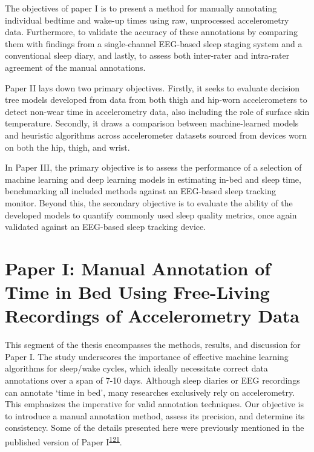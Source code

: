 \documentclass[
  10pt,
]{scrbook}
\begin{document}
The objectives of paper I is to present a method for manually annotating
individual bedtime and wake-up times using raw, unprocessed
accelerometry data. Furthermore, to validate the accuracy of these
annotations by comparing them with findings from a single-channel
EEG-based sleep staging system and a conventional sleep diary, and
lastly, to assess both inter-rater and intra-rater agreement of the
manual annotations.

Paper II lays down two primary objectives. Firstly, it seeks to evaluate
decision tree models developed from data from both thigh and hip-worn
accelerometers to detect non-wear time in accelerometry data, also
including the role of surface skin temperature. Secondly, it draws a
comparison between machine-learned models and heuristic algorithms
across accelerometer datasets sourced from devices worn on both the hip,
thigh, and wrist.

In Paper III, the primary objective is to assess the performance of a
selection of machine learning and deep learning models in estimating
in-bed and sleep time, benchmarking all included methods against an
EEG-based sleep tracking monitor. Beyond this, the secondary objective
is to evaluate the ability of the developed models to quantify commonly
used sleep quality metrics, once again validated against an EEG-based
sleep tracking device.

\hypertarget{paper-i-manual-annotation-of-time-in-bed-using-free-living-recordings-of-accelerometry-data}{%
\chapter{Paper I: Manual Annotation of Time in Bed Using Free-Living
Recordings of Accelerometry
Data}\label{paper-i-manual-annotation-of-time-in-bed-using-free-living-recordings-of-accelerometry-data}}

This segment of the thesis encompasses the methods, results, and
discussion for Paper I. The study underscores the importance of
effective machine learning algorithms for sleep/wake cycles, which
ideally necessitate correct data annotations over a span of 7-10 days.
Although sleep diaries or EEG recordings can annotate `time in bed',
many researches exclusively rely on accelerometry. This emphasizes the
imperative for valid annotation techniques. Our objective is to
introduce a manual annotation method, assess its precision, and
determine its consistency. Some of the details presented here were
previously mentioned in the published version of Paper
I\textsuperscript{\protect\hyperlink{ref-skovgaard_manual_2021}{121}}.
\end{document}
